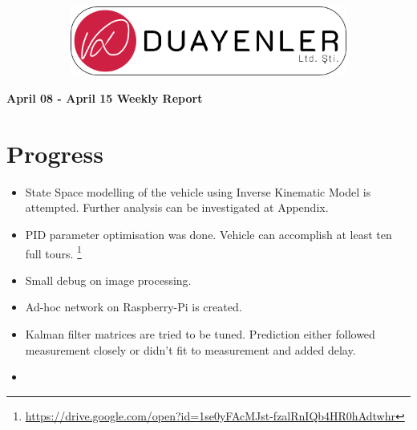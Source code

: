 \documentclass[a4paper,12pt]{article}
\begin{document}
	
\begin{figure}
	\vspace*{-.7cm}
	\centering
	\begin{figure}[H]
		\centering
		\setlength{\unitlength}{\textwidth} 
		\includegraphics[width=0.9\unitlength]{../../../documents/logos/logo3-with-stroke}
	\end{figure}
\end{figure}
\vspace*{-1.7cm}
\begin{center}
	\Large\textbf{April 08 - April 15 Weekly Report}
	\end{center}
\section{Progress}
\begin{itemize}
 
	 \item State Space modelling of the vehicle using Inverse Kinematic Model is attempted. Further analysis can be investigated at Appendix. 
	 
	 \item PID parameter optimisation was done. Vehicle can accomplish at least ten full tours. \footnote{ \href{ https://drive.google.com/open?id=1se0yFAcMJst-fzalRnIQb4HR0hAdtwhr}{https://drive.google.com/open?id=1se0yFAcMJst-fzalRnIQb4HR0hAdtwhr} }
	
	 \item Small debug on image processing.
	 
	 \item Ad-hoc network on Raspberry-Pi is created.
	 
	 \item Kalman filter matrices are tried to be tuned. Prediction either followed measurement closely or didn't fit to measurement and added delay.
	 
	 \item 
	 
	 
	 
	 
	
	\end{itemize}
\end{document}
